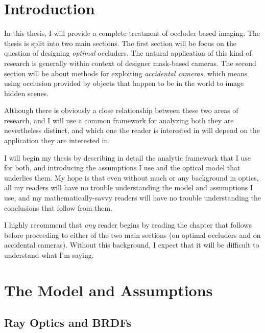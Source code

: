 \chapter{Introduction}

In this thesis, I will provide a complete treatment of occluder-based imaging. The thesis is split into two main sections. The first section will be focus on the question of designing \emph{optimal} occluders. The natural application of this kind of research is generally within context of designer mask-based cameras. The second section will be about methods for exploiting \emph{accidental cameras}, which means using occlusion provided by objects that happen to be in the world to image hidden scenes. 

Although there is obviously a close relationship between these two areas of research, and I will use a common framework for analyzing both they are nevertheless distinct, and which one the reader is interested in will depend on the application they are interested in.

I will begin my thesis by describing in detail the analytic framework that I use for both, and introducing the assumptions I use and the optical model that underlies them. My hope is that even without much or any background in optics, all my readers will have no trouble understanding the model and assumptions I use, and my mathematically-savvy readers will have no trouble understanding the conclusions that follow from them. 

I highly recommend that \emph{any} reader begins by reading the chapter that follows before proceeding to either of the two main sections (on optimal occluders and on accidental cameras). Without this background, I expect that it will be difficult to understand what I'm saying.

\chapter{The Model and Assumptions}

\section{Ray Optics and BRDFs}

